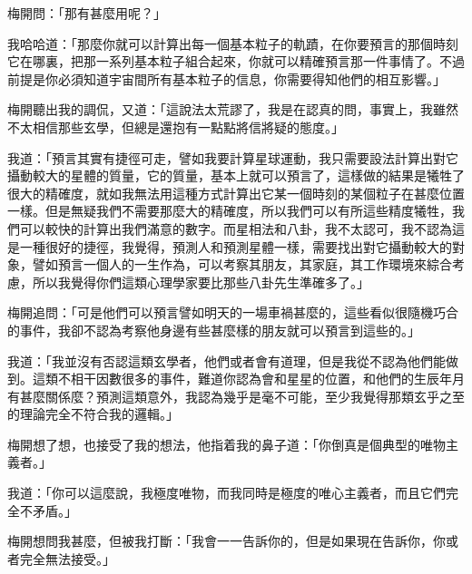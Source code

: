 梅開問：「那有甚麼用呢？」

我哈哈道：「那麼你就可以計算出每一個基本粒子的軌蹟，在你要預言的那個時刻它在哪裏，把那一系列基本粒子組合起來，你就可以精確預言那一件事情了。不過前提是你必須知道宇宙間所有基本粒子的信息，你需要得知他們的相互影響。」


梅開聽出我的調侃，又道：「這說法太荒謬了，我是在認真的問，事實上，我雖然不太相信那些玄學，但總是還抱有一點點將信將疑的態度。」

我道：「預言其實有捷徑可走，譬如我要計算星球運動，我只需要設法計算出對它攝動較大的星體的質量，它的質量，基本上就可以預言了，這樣做的結果是犧牲了很大的精確度，就如我無法用這種方式計算出它某一個時刻的某個粒子在甚麼位置一樣。但是無疑我們不需要那麼大的精確度，所以我們可以有所這些精度犧牲，我們可以較快的計算出我們滿意的數字。而星相法和八卦，我不太認可，我不認為這是一種很好的捷徑，我覺得，預測人和預測星體一樣，需要找出對它攝動較大的對象，譬如預言一個人的一生作為，可以考察其朋友，其家庭，其工作環境來綜合考慮，所以我覺得你們這類心理學家要比那些八卦先生準確多了。」

梅開追問：「可是他們可以預言譬如明天的一場車禍甚麼的，這些看似很隨機巧合的事件，我卻不認為考察他身邊有些甚麼樣的朋友就可以預言到這些的。」

我道：「我並沒有否認這類玄學者，他們或者會有道理，但是我從不認為他們能做到。這類不相干因數很多的事件，難道你認為會和星星的位置，和他們的生辰年月有甚麼關係麼？預測這類意外，我認為幾乎是毫不可能，至少我覺得那類玄乎之至的理論完全不符合我的邏輯。」

梅開想了想，也接受了我的想法，他指着我的鼻子道：「你倒真是個典型的唯物主義者。」

我道：「你可以這麼說，我極度唯物，而我同時是極度的唯心主義者，而且它們完全不矛盾。」

梅開想問我甚麼，但被我打斷：「我會一一告訴你的，但是如果現在告訴你，你或者完全無法接受。」


